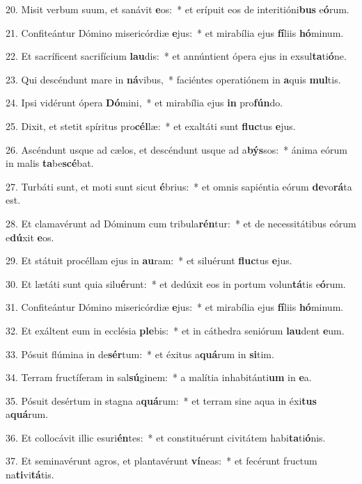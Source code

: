 20. Misit verbum suum, et sanávit \textbf{e}os:~*  et erípuit eos de interitióni\textbf{bus} e\textbf{ó}rum.\

21. Confiteántur Dómino misericórdiæ \textbf{e}jus:~*  et mirabília ejus \textbf{fí}liis \textbf{hó}minum.\

22. Et sacríficent sacrifícium \textbf{lau}dis:~*  et annúntient ópera ejus in exsul\textbf{ta}ti\textbf{ó}ne.\

23. Qui descéndunt mare in \textbf{ná}vibus,~*  faciéntes operatiónem in \textbf{a}quis \textbf{mul}tis.\

24. Ipsi vidérunt ópera \textbf{Dó}mini,~*  et mirabília ejus \textbf{in} pro\textbf{fún}do.\

25. Dixit, et stetit spíritus pro\textbf{cél}læ:~*  et exaltáti sunt \textbf{fluc}tus \textbf{e}jus.\

26. Ascéndunt usque ad cælos, et descéndunt usque ad a\textbf{býs}sos:~*  ánima eórum in malis \textbf{ta}be\textbf{scé}bat.\

27. Turbáti sunt, et moti sunt sicut \textbf{é}brius:~*  et omnis sapiéntia eórum \textbf{de}vo\textbf{rá}ta est.\

28. Et clamavérunt ad Dóminum cum tribula\textbf{rén}tur:~*  et de necessitátibus eórum e\textbf{dú}xit \textbf{e}os.\

29. Et státuit procéllam ejus in \textbf{au}ram:~*  et siluérunt \textbf{fluc}tus \textbf{e}jus.\

30. Et lætáti sunt quia silu\textbf{é}runt:~*  et dedúxit eos in portum volun\textbf{tá}tis e\textbf{ó}rum.\

31. Confiteántur Dómino misericórdiæ \textbf{e}jus:~*  et mirabília ejus \textbf{fí}liis \textbf{hó}minum.\

32. Et exáltent eum in ecclésia \textbf{ple}bis:~*  et in cáthedra seniórum \textbf{lau}dent \textbf{e}um.\

33. Pósuit flúmina in de\textbf{sér}tum:~*  et éxitus a\textbf{quá}rum in \textbf{si}tim.\

34. Terram fructíferam in sal\textbf{sú}ginem:~*  a malítia inhabitánti\textbf{um} in \textbf{e}a.\

35. Pósuit desértum in stagna a\textbf{quá}rum:~*  et terram sine aqua in éxi\textbf{tus} a\textbf{quá}rum.\

36. Et collocávit illic esuri\textbf{én}tes:~*  et constituérunt civitátem habi\textbf{ta}ti\textbf{ó}nis.\

37. Et seminavérunt agros, et plantavérunt \textbf{ví}neas:~*  et fecérunt fructum na\textbf{ti}vi\textbf{tá}tis.\

